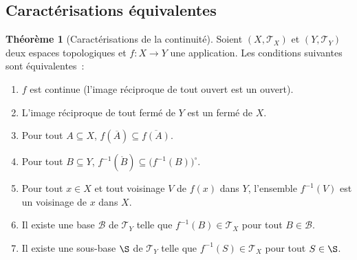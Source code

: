 \documentclass[12pt,a4paper,openany]{book}
\theoremstyle{definition}
\theoremstyle{cours}
\newtheorem{theoreme}{Théorème}[chapter]
\theoremstyle{coursnormal}
\newcommand{\T}{\mathcal{T}}
\newcommand{\B}{\mathcal{B}}
\begin{document}
\subsection{Caractérisations équivalentes}\label{subsec:continuite-equiv}

\begin{theoreme}[Caractérisations de la continuité]\label{thm:carac-continuite}
  Soient $(X,\T_X)$ et $(Y,\T_Y)$ deux espaces topologiques et
  $f\colon X\to Y$ une application. Les conditions suivantes sont
  équivalentes~:
  \begin{enumerate}[label=\textup{(\roman*)}]
    \item\label{cont:ouverts} $f$ est continue (l'image réciproque de tout
      ouvert est un ouvert).
    \item\label{cont:fermes} L'image réciproque de tout fermé de $Y$ est un
      fermé de $X$.
    \item\label{cont:adherence} Pour tout $A\subseteq X$,
      $f(\overline{A})\subseteq\overline{f(A)}$.
    \item\label{cont:interieur} Pour tout $B\subseteq Y$,
      $f^{-1}(\mathring{B})\subseteq\bigl(f^{-1}(B)\bigr)^{\circ}$.
    \item\label{cont:voisinages} Pour tout $x\in X$ et tout voisinage $V$ de
      $f(x)$ dans $Y$, l'ensemble $f^{-1}(V)$ est un voisinage de $x$
      dans $X$.
    \item\label{cont:base} Il existe une base $\B$ de $\T_Y$ telle que
      $f^{-1}(B)\in\T_X$ pour tout $B\in\B$.
    \item\label{cont:sousbase} Il existe une sous-base $\S$ de $\T_Y$ telle
      que $f^{-1}(S)\in\T_X$ pour tout $S\in\S$.
  \end{enumerate}
\end{theoreme}
\end{document}
